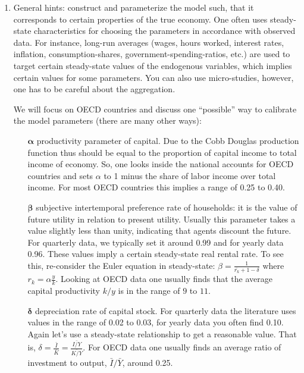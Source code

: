 \begin{enumerate}
\item General hints: construct and parameterize the model such, that it corresponds to certain properties of the true economy.
One often uses steady-state characteristics for choosing the parameters in accordance with observed data.
For instance, long-run averages (wages, hours worked, interest rates, inflation, consumption-shares, government-spending-ratios, etc.) are used 
  to target certain steady-state values of the endogenous variables, which implies certain values for some parameters.
You can also use micro-studies, however, one has to be careful about the aggregation.

We will focus on OECD countries and discuss one \enquote{possible} way to calibrate the model parameters (there are many other ways):

\begin{itemize}

\item[\(\boldsymbol{\alpha}\)] productivity parameter of capital.
Due to the Cobb Douglas production function thus should be equal to the proportion of capital income to total income of economy.
So, one looks inside the national accounts for OECD countries and sets \(\alpha \) to 1 minus the share of labor income over total income.
For most OECD countries this implies a range of 0.25 to 0.40.

\item[\(\boldsymbol{\beta}\)] subjective intertemporal preference rate of households:
  it is the value of future utility in relation to present utility.
Usually this parameter takes a value slightly less than unity, indicating that agents discount the future.
For quarterly data, we typically set it around 0.99 and for yearly data 0.96.
These values imply a certain steady-state real rental rate.
To see this, re-consider the Euler equation in steady-state: \(\beta = \frac{1}{\bar{r_k}+1-\delta}\) where \(r_k= \alpha \frac{y}{k}\).
Looking at OECD data one usually finds that the average capital productivity \(k/y\) is in the range of \(9\) to \(11\).

\item[\(\boldsymbol{\delta}\)] depreciation rate of capital stock.
For quarterly data the literature uses values in the range of 0.02 to 0.03, for yearly data you often find 0.10.
Again let's use a steady-state relationship to get a reasonable value.
That is, \(\delta=\frac{\bar{I}}{\bar{K}}=\frac{\bar{I/Y}}{\bar{K/Y}}\).
For OECD data one usually finds an average ratio of investment to output, \(\bar{I}/\bar{Y}\), around 0.25.


\end{itemize}
\end{enumerate}
